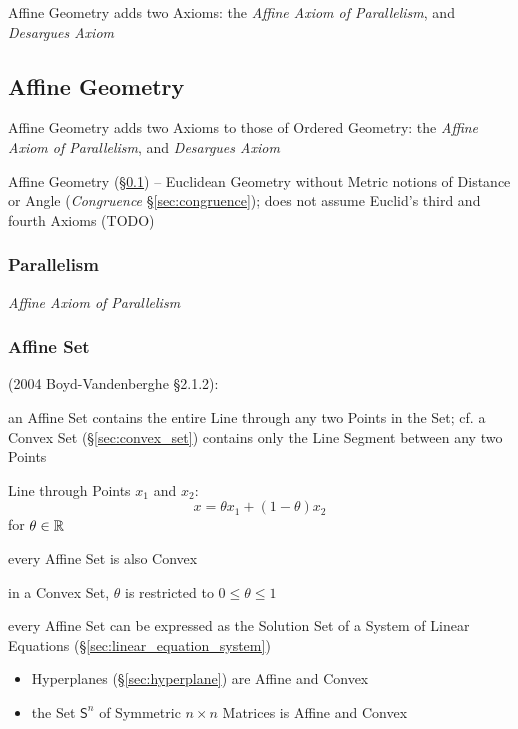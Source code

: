 Affine Geometry adds two Axioms: the \emph{Affine Axiom of Parallelism}, and
\emph{Desargues Axiom}



\subsection{Affine Geometry}\label{sec:affine_geometry}

Affine Geometry adds two Axioms to those of Ordered Geometry: the \emph{Affine
  Axiom of Parallelism}, and \emph{Desargues Axiom}

Affine Geometry (\S\ref{sec:affine_geometry}) -- Euclidean Geometry without
Metric notions of Distance or Angle (\emph{Congruence} \S\ref{sec:congruence});
does not assume Euclid's third and fourth Axioms (TODO)



\subsubsection{Parallelism}\label{sec:parallelism}

\emph{Affine Axiom of Parallelism}



\subsubsection{Affine Set}\label{sec:affine_set}

(2004 Boyd-Vandenberghe \S2.1.2):

an Affine Set contains the entire Line through any two Points in the Set; cf. a
Convex Set (\S\ref{sec:convex_set}) contains only the Line Segment between any
two Points

Line through Points $x_1$ and $x_2$:
\[
  x = \theta x_1 + (1-\theta) x_2
\]
for $\theta \in \mathbb{R}$

every Affine Set is also Convex

\fist in a Convex Set, $\theta$ is restricted to $0 \leq \theta \leq 1$

every Affine Set can be expressed as the Solution Set of a System of Linear
Equations (\S\ref{sec:linear_equation_system})

\begin{itemize}
  \item Hyperplanes (\S\ref{sec:hyperplane}) are Affine and Convex
  \item the Set $\mathsf{S}^n$ of Symmetric $n \times n$ Matrices is Affine and
    Convex
\end{itemize}

